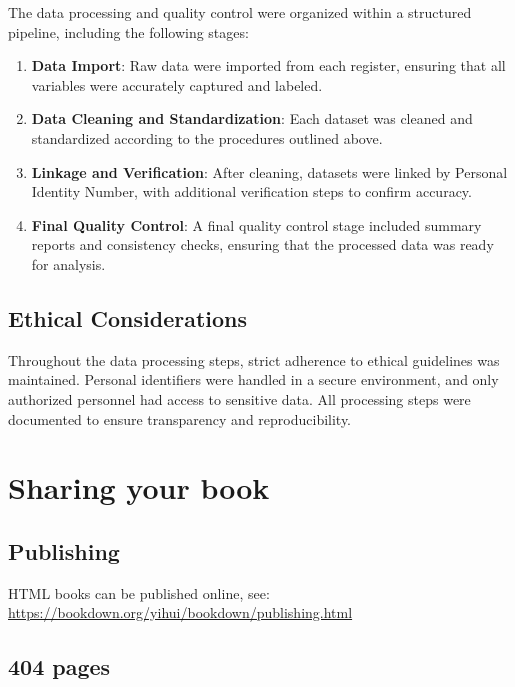 \documentclass[
]{book}
\providecommand{\tightlist}{%
  \setlength{\itemsep}{0pt}\setlength{\parskip}{0pt}}
\begin{document}
The data processing and quality control were organized within a structured pipeline, including the following stages:

\begin{enumerate}
\def\labelenumi{\arabic{enumi}.}
\tightlist
\item
  \textbf{Data Import}: Raw data were imported from each register, ensuring that all variables were accurately captured and labeled.
\item
  \textbf{Data Cleaning and Standardization}: Each dataset was cleaned and standardized according to the procedures outlined above.
\item
  \textbf{Linkage and Verification}: After cleaning, datasets were linked by Personal Identity Number, with additional verification steps to confirm accuracy.
\item
  \textbf{Final Quality Control}: A final quality control stage included summary reports and consistency checks, ensuring that the processed data was ready for analysis.
\end{enumerate}

\hypertarget{ethical-considerations-1}{%
\section{Ethical Considerations}\label{ethical-considerations-1}}

Throughout the data processing steps, strict adherence to ethical guidelines was maintained. Personal identifiers were handled in a secure environment, and only authorized personnel had access to sensitive data. All processing steps were documented to ensure transparency and reproducibility.

\hypertarget{sharing-your-book}{%
\chapter{Sharing your book}\label{sharing-your-book}}

\hypertarget{publishing}{%
\section{Publishing}\label{publishing}}

HTML books can be published online, see: \url{https://bookdown.org/yihui/bookdown/publishing.html}

\hypertarget{pages}{%
\section{404 pages}\label{pages}}
\end{document}
